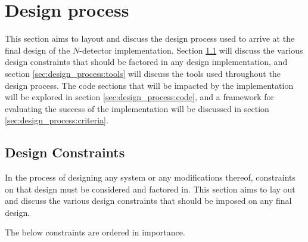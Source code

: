 \documentclass{article}
\begin{document}
\section{Design process} \label{sec:design_process}

This section aims to layout and discuss the design process used to arrive at the final design of the \(N\)-detector implementation.
Section \ref{sec:design_process:constraints} will discuss the various design constraints that should be factored in any design implementation, and section \ref{sec:design_process:tools} will discuss the tools used throughout the design process.
The code sections that will be impacted by the implementation will be explored in section \ref{sec:design_process:code}, and a framework for evaluating the success of the implementation will be discussed in section \ref{sec:design_process:criteria}.

\subsection{Design Constraints} \label{sec:design_process:constraints}

In the process of designing any system or any modifications thereof, constraints on that design must be considered and factored in.
This section aims to lay out and discuss the various design constraints that should be imposed on any final design.

The below constraints are ordered in importance.
\end{document}
